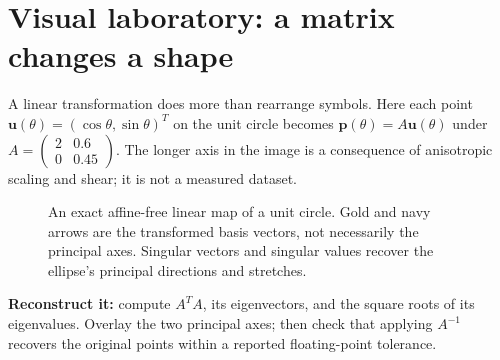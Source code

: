 \clearpage
\section*{Visual laboratory: a matrix changes a shape}
\noindent A linear transformation does more than rearrange symbols. Here each point
\(\mathbf u(\theta)=(\cos\theta,\sin\theta)^T\) on the unit circle becomes
\(\mathbf p(\theta)=A\mathbf u(\theta)\) under
\(A=\begin{pmatrix}2&0.6\\0&0.45\end{pmatrix}\).
The longer axis in the image is a consequence of anisotropic scaling and shear;
it is not a measured dataset.
\begin{figure}[!htbp]
\centering
{}
\caption{An exact affine-free linear map of a unit circle. Gold and navy arrows are the transformed basis vectors, not necessarily the principal axes. Singular vectors and singular values recover the ellipse's principal directions and stretches.}
\label{fig:book02-linear-transformation}
\end{figure}
\noindent\textbf{Reconstruct it:} compute \(A^TA\), its eigenvectors,
and the square roots of its eigenvalues. Overlay the two principal axes;
then check that applying \(A^{-1}\) recovers the original points within a
reported floating-point tolerance.
